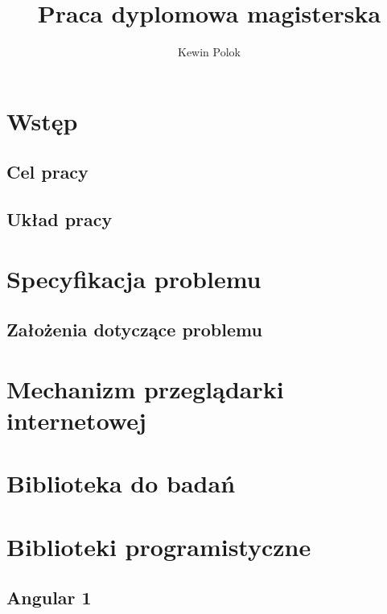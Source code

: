 \documentclass[polish, twoside, 12pt]{mwart}
\author{Kewin Polok}
\title{Praca dyplomowa magisterska}
\begin{document}
\maketitle
 
\newpage

\tableofcontents

\newpage

\listoffigures
 
\listoftables

\newpage

\section{Wstęp}

\subsection{Cel pracy}

\subsection{Układ pracy}

\section{Specyfikacja problemu}

\subsection{Założenia dotyczące problemu}

\section{Mechanizm przeglądarki internetowej}

\section{Biblioteka do badań}

\section{Biblioteki programistyczne}

\subsection{Angular 1}
\end{document}
